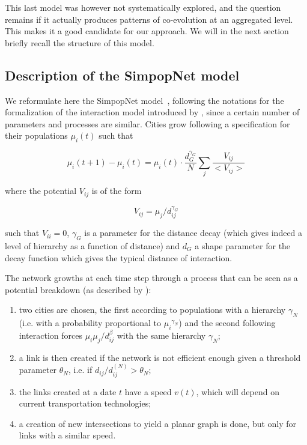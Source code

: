 \documentclass[graybox]{svmult}
\begin{document}
This last model was however not systematically explored, and the question remains if it actually produces patterns of co-evolution at an aggregated level. This makes it a good candidate for our approach. We will in the next section briefly recall the structure of this model.



\subsection{Description of the SimpopNet model}


We reformulate here the SimpopNet model~\cite{schmitt2014modelisation}, following the notations for the formalization of the interaction model introduced by \cite{raimbault2018indirect}, since a certain number of parameters and processes are similar. Cities grow following a specification for their populations $\mu_i(t)$ such that

\begin{equation}
\mu_i(t+1) - \mu_i (t) = \mu_i (t) \cdot \frac{d_G^{\gamma_G}}{N} \sum_{j} \frac{V_{ij}}{<V_{ij}>}
\end{equation}

where the potential $V_{ij}$ is of the form 

\begin{equation}
V_{ij} = \mu_j / d_{ij}^{\gamma_G}
\end{equation}

such that $V_{ii}=0$, $\gamma_G$ is a parameter for the distance decay (which gives indeed a level of hierarchy as a function of distance) and $d_G$ a shape parameter for the decay function which gives the typical distance of interaction.


The network growths at each time step through a process that can be seen as a potential breakdown (as described by \cite{raimbault:tel-01857741}):
\begin{enumerate}
	\item two cities are chosen, the first according to populations with a hierarchy $\gamma_N$ (i.e. with a probability proportional to ${\mu_i}^{\gamma_N}$) and the second following interaction forces $\mu_i \mu_j / d_{ij}^\beta$ with the same hierarchy $\gamma_N$;
	\item a link is then created if the network is not efficient enough given a threshold parameter $\theta_N$, i.e. if $d_{ij}/d^{(N)}_{ij}> \theta_N$;
	\item the links created at a date $t$ have a speed $v(t)$, which will depend on current transportation technologies;
	\item a creation of new intersections to yield a planar graph is done, but only for links with a similar speed.
\end{enumerate}
\end{document}
